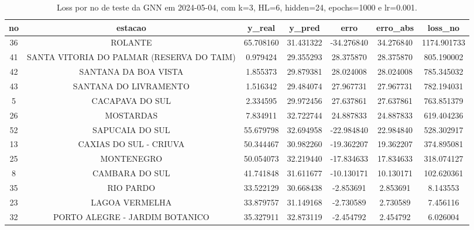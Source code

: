 \begin{table}[h]
\centering
\caption{Loss por no de teste da GNN em 2024-05-04, com k=3, HL=6, hidden=24, epochs=1000 e lr=0.001.}
\label{tab:gnn_loss_k3_hl6_h24_e1000_d20240504}
\begin{tabular}{ccccccc}
\toprule
no & estacao & y\_real & y\_pred & erro & erro\_abs & loss\_no \\
\midrule
36 & ROLANTE & 65.708160 & 31.431322 & -34.276840 & 34.276840 & 1174.901733 \\
41 & SANTA VITORIA DO PALMAR (RESERVA DO TAIM) & 0.979424 & 29.355293 & 28.375870 & 28.375870 & 805.190002 \\
42 & SANTANA DA BOA VISTA & 1.855373 & 29.879381 & 28.024008 & 28.024008 & 785.345032 \\
43 & SANTANA DO LIVRAMENTO & 1.516342 & 29.484074 & 27.967731 & 27.967731 & 782.194031 \\
5 & CACAPAVA DO SUL & 2.334595 & 29.972456 & 27.637861 & 27.637861 & 763.851379 \\
26 & MOSTARDAS & 7.834911 & 32.722744 & 24.887833 & 24.887833 & 619.404236 \\
52 & SAPUCAIA DO SUL & 55.679798 & 32.694958 & -22.984840 & 22.984840 & 528.302917 \\
13 & CAXIAS DO SUL - CRIUVA & 50.344467 & 30.982260 & -19.362207 & 19.362207 & 374.895081 \\
25 & MONTENEGRO & 50.054073 & 32.219440 & -17.834633 & 17.834633 & 318.074127 \\
8 & CAMBARA DO SUL & 41.741848 & 31.611677 & -10.130171 & 10.130171 & 102.620361 \\
35 & RIO PARDO & 33.522129 & 30.668438 & -2.853691 & 2.853691 & 8.143553 \\
23 & LAGOA VERMELHA & 33.879757 & 31.149168 & -2.730589 & 2.730589 & 7.456116 \\
32 & PORTO ALEGRE - JARDIM BOTANICO & 35.327911 & 32.873119 & -2.454792 & 2.454792 & 6.026004 \\
\bottomrule
\end{tabular}
\end{table}
